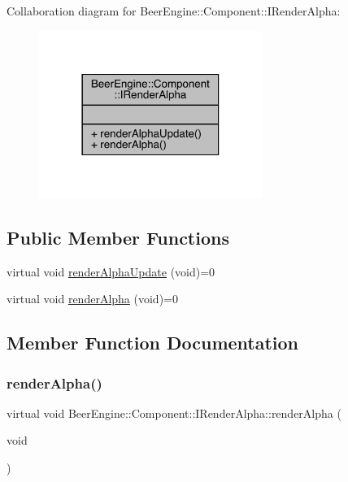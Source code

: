 Collaboration diagram for Beer\+Engine\+:\+:Component\+:\+:I\+Render\+Alpha\+:\nopagebreak
\begin{figure}[H]
\begin{center}
\leavevmode
\includegraphics[width=206pt]{class_beer_engine_1_1_component_1_1_i_render_alpha__coll__graph}
\end{center}
\end{figure}
\subsection*{Public Member Functions}
\begin{DoxyCompactItemize}
\item 
virtual void \mbox{\hyperlink{class_beer_engine_1_1_component_1_1_i_render_alpha_ad0fd47a02cc63152b25dbfdb4b2639fa}{render\+Alpha\+Update}} (void)=0
\item 
virtual void \mbox{\hyperlink{class_beer_engine_1_1_component_1_1_i_render_alpha_a3797df36149a8a8416ef24406923f068}{render\+Alpha}} (void)=0
\end{DoxyCompactItemize}


\subsection{Member Function Documentation}
\mbox{\label{class_beer_engine_1_1_component_1_1_i_render_alpha_a3797df36149a8a8416ef24406923f068}} 
\subsubsection{\texorpdfstring{render\+Alpha()}{renderAlpha()}}
{\footnotesize\ttfamily virtual void Beer\+Engine\+::\+Component\+::\+I\+Render\+Alpha\+::render\+Alpha (\begin{DoxyParamCaption}\item[{void}]{ }\end{DoxyParamCaption})\hspace{0.3cm}{\ttfamily [pure virtual]}}



